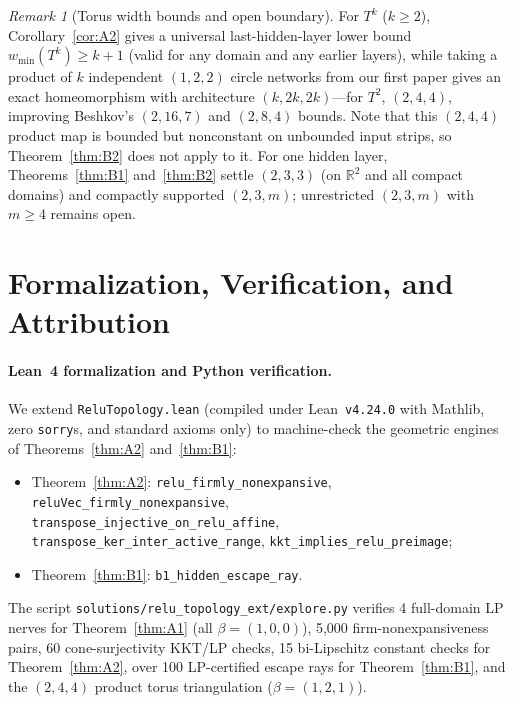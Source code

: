 \documentclass[11pt]{article}
\theoremstyle{plain}
\theoremstyle{definition}
\theoremstyle{remark}
\newtheorem{remark}{Remark}
\begin{document}
\begin{remark}[Torus width bounds and open boundary]
For $T^k$ ($k \ge 2$), Corollary~\ref{cor:A2} gives a universal last-hidden-layer lower bound $w_{\min}(T^k) \ge k + 1$ (valid for any domain and any earlier layers), while taking a product of $k$ independent $(1, 2, 2)$ circle networks from our first paper gives an exact homeomorphism with architecture $(k, 2k, 2k)$---for $T^2$, $(2, 4, 4)$, improving Beshkov's $(2, 16, 7)$ and $(2, 8, 4)$ bounds. Note that this $(2, 4, 4)$ product map is bounded but nonconstant on unbounded input strips, so Theorem~\ref{thm:B2} does not apply to it. For one hidden layer, Theorems~\ref{thm:B1} and~\ref{thm:B2} settle $(2, 3, 3)$ (on $\mathbb{R}^2$ and all compact domains) and compactly supported $(2, 3, m)$; unrestricted $(2, 3, m)$ with $m \ge 4$ remains open.
\end{remark}

\section{Formalization, Verification, and Attribution}

\paragraph{Lean~4 formalization and Python verification.}
We extend \texttt{ReluTopology.lean} (compiled under Lean~\texttt{v4.24.0} with Mathlib, zero \texttt{sorry}s, and standard axioms only) to machine-check the geometric engines of Theorems~\ref{thm:A2} and~\ref{thm:B1}:
\begin{itemize}[leftmargin=2em,itemsep=1pt,topsep=3pt]
\item Theorem~\ref{thm:A2}: \texttt{relu\_firmly\_nonexpansive}, \texttt{reluVec\_firmly\_nonexpansive},\\
\texttt{transpose\_injective\_on\_relu\_affine},\\
\texttt{transpose\_ker\_inter\_active\_range}, \texttt{kkt\_implies\_relu\_preimage};
\item Theorem~\ref{thm:B1}: \texttt{b1\_hidden\_escape\_ray}.
\end{itemize}
The script \texttt{solutions/relu\_topology\_ext/explore.py} verifies 4 full-domain LP nerves for Theorem~\ref{thm:A1} (all $\beta = (1,0,0)$), 5,000 firm-nonexpansiveness pairs, 60 cone-surjectivity KKT/LP checks, 15 bi-Lipschitz constant checks for Theorem~\ref{thm:A2}, over 100 LP-certified escape rays for Theorem~\ref{thm:B1}, and the $(2,4,4)$ product torus triangulation ($\beta = (1,2,1)$).
\end{document}
